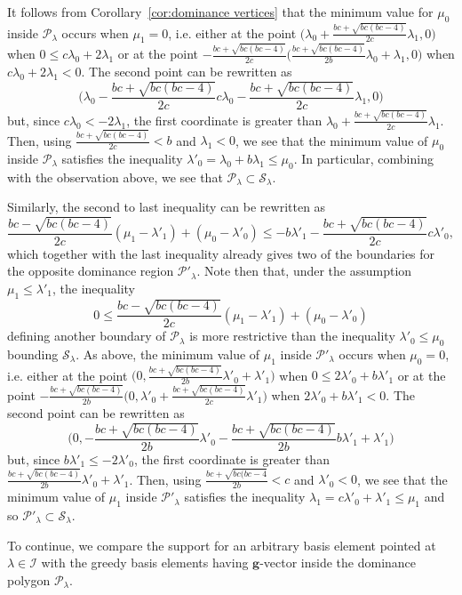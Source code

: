 \documentclass{amsart}
\numberwithin{theorem}{section}
\newcommand{\bfg}{\boldsymbol{g}}
\newcommand{\cI}{\mathcal{I}}
\newcommand{\cP}{\mathcal{P}}
\newcommand{\cS}{\mathcal{S}}
\begin{document}
  It follows from Corollary~\ref{cor:dominance vertices} that the minimum value for $\mu_0$ inside $\cP_\lambda$ occurs when $\mu_1=0$, i.e. either at the point $\big( \lambda_0+\frac{bc+\sqrt{bc(bc-4)}}{2c}\lambda_1 , 0 \big)$ when $0 \leq c\lambda_0+2\lambda_1$ or at the point $-\frac{bc+\sqrt{bc(bc-4)}}{2c} \big( \frac{bc+\sqrt{bc(bc-4)}}{2b}\lambda_0+\lambda_1 , 0 \big)$ when $c\lambda_0+2\lambda_1<0$.
  The second point can be rewritten as
  \[\big(\lambda_0 -\frac{bc+\sqrt{bc(bc-4)}}{2c} c\lambda_0-\frac{bc+\sqrt{bc(bc-4)}}{2c} \lambda_1 , 0 \big)\]
  but, since $c\lambda_0 < -2\lambda_1$, the first coordinate is greater than $\lambda_0+\frac{bc+\sqrt{bc(bc-4)}}{2c}\lambda_1$.
  Then, using $\frac{bc+\sqrt{bc(bc-4)}}{2c}<b$ and $\lambda_1<0$, we see that the minimum value of $\mu_0$ inside $\cP_\lambda$ satisfies the inequality $\lambda'_0=\lambda_0+b\lambda_1 \leq \mu_0$.
  In particular, combining with the observation above, we see that $\cP_\lambda\subset\cS_\lambda$.

  Similarly, the second to last inequality can be rewritten as
  \[ \frac{b c-\sqrt{b c (b c-4)}}{2 c}(\mu_1-\lambda'_1)+(\mu_0-\lambda'_0) \leq -b\lambda'_1-\frac{b c+\sqrt{b c (b c-4)}}{2c}c\lambda'_0,\]
  which together with the last inequality already gives two of the boundaries for the opposite dominance region $\cP'_\lambda$.
  Note then that, under the assumption $\mu_1\leq\lambda'_1$, the inequality
  \[ 0 \leq \frac{b c-\sqrt{b c (b c-4)}}{2 c}(\mu_1-\lambda'_1)+(\mu_0-\lambda'_0) \]
  defining another boundary of $\cP_\lambda$ is more restrictive than the inequality $\lambda'_0\leq\mu_0$ bounding $\cS_\lambda$.
  As above, the minimum value of $\mu_1$ inside $\cP'_\lambda$ occurs when $\mu_0=0$, i.e. either at the point $\big(0, \frac{bc+\sqrt{bc(bc-4)}}{2b}\lambda'_0+\lambda'_1 \big)$
  when $0 \leq 2\lambda'_0+b\lambda'_1$ or at the point $-\frac{bc+\sqrt{bc(bc-4)}}{2b} \big(0, \lambda'_0+\frac{bc+\sqrt{bc(bc-4)}}{2c}\lambda'_1 \big)$
  when $2\lambda'_0+b\lambda'_1<0$.
  The second point can be rewritten as
  \[\big(0, -\frac{bc+\sqrt{bc(bc-4)}}{2b} \lambda'_0-\frac{bc+\sqrt{bc(bc-4)}}{2b} b\lambda'_1+\lambda'_1 \big)\]
  but, since $b\lambda'_1\le -2\lambda'_0$, the first coordinate is greater than $\frac{bc+\sqrt{bc(bc-4)}}{2b}\lambda'_0+\lambda'_1$.
  Then, using $\frac{bc+\sqrt{bc(bc-4}}{2b}<c$ and $\lambda'_0<0$, we see that the minimum value of $\mu_1$ inside $\cP'_\lambda$ satisfies the inequality $\lambda_1=c\lambda'_0+\lambda'_1\le\mu_1$ and so $\cP'_\lambda\subset\cS_\lambda$.

  To continue, we compare the support for an arbitrary basis element pointed at $\lambda\in\cI$ with the greedy basis elements having $\bfg$-vector inside the dominance polygon $\cP_\lambda$.
\end{document}
